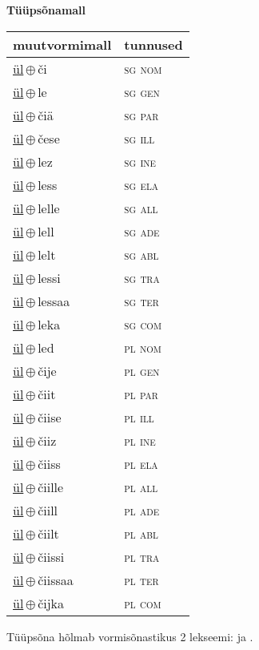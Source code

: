 

\vspace{3.5em}
\noindent \begin{minipage}{\textwidth}
\noindent \textbf{Tüüpsõnamall \,}\\

\begin{sideways}
\begin{tabular}{l l}
muutvormimall & tunnused \\
\hline
\underline{ül}\,$\oplus$\,či & \textsc{ sg nom } \\
\underline{ül}\,$\oplus$\,le & \textsc{ sg gen } \\
\underline{ül}\,$\oplus$\,čiä & \textsc{ sg par } \\
\underline{ül}\,$\oplus$\,čese & \textsc{ sg ill } \\
\underline{ül}\,$\oplus$\,lez & \textsc{ sg ine } \\
\underline{ül}\,$\oplus$\,less & \textsc{ sg ela } \\
\underline{ül}\,$\oplus$\,lelle & \textsc{ sg all } \\
\underline{ül}\,$\oplus$\,lell & \textsc{ sg ade } \\
\underline{ül}\,$\oplus$\,lelt & \textsc{ sg abl } \\
\underline{ül}\,$\oplus$\,lessi & \textsc{ sg tra } \\
\underline{ül}\,$\oplus$\,lessaa & \textsc{ sg ter } \\
\underline{ül}\,$\oplus$\,leka & \textsc{ sg com } \\
\underline{ül}\,$\oplus$\,led & \textsc{ pl nom } \\
\underline{ül}\,$\oplus$\,čije & \textsc{ pl gen } \\
\underline{ül}\,$\oplus$\,čiit & \textsc{ pl par } \\
\underline{ül}\,$\oplus$\,čiise & \textsc{ pl ill } \\
\underline{ül}\,$\oplus$\,čiiz & \textsc{ pl ine } \\
\underline{ül}\,$\oplus$\,čiiss & \textsc{ pl ela } \\
\underline{ül}\,$\oplus$\,čiille & \textsc{ pl all } \\
\underline{ül}\,$\oplus$\,čiill & \textsc{ pl ade } \\
\underline{ül}\,$\oplus$\,čiilt & \textsc{ pl abl } \\
\underline{ül}\,$\oplus$\,čiissi & \textsc{ pl tra } \\
\underline{ül}\,$\oplus$\,čiissaa & \textsc{ pl ter } \\
\underline{ül}\,$\oplus$\,čijka & \textsc{ pl com } \\
\end{tabular}
\end{sideways}
\label{tab:tüüpsõnamall-ülči}

\end{minipage}

 
\vspace{1em}
\noindent Tüüpsõna hõlmab vormisõnastikus 2 lekseemi:  ja .
